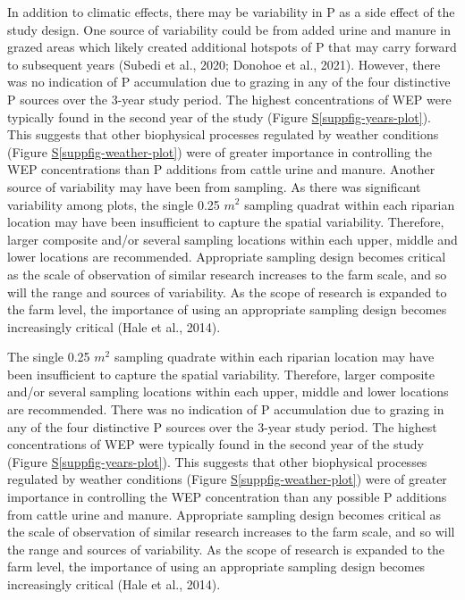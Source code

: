 \documentclass[
]{agujournal2019}
\newcommand*\quartosuppfigref[1]{Figure \hyperref[#1]{S\ref{#1}}}
\begin{document}
In addition to climatic effects, there may be variability in P as a side
effect of the study design. One source of variability could be from
added urine and manure in grazed areas which likely created additional
hotspots of P that may carry forward to subsequent years (Subedi et al.,
2020; Donohoe et al., 2021). However, there was no indication of P
accumulation due to grazing in any of the four distinctive P sources
over the 3-year study period. The highest concentrations of WEP were
typically found in the second year of the study
(\quartosuppfigref{suppfig-years-plot}). This suggests that other
biophysical processes regulated by weather conditions
(\quartosuppfigref{suppfig-weather-plot}) were of greater importance in
controlling the WEP concentrations than P additions from cattle urine
and manure. Another source of variability may have been from sampling.
As there was significant variability among plots, the single 0.25
\(m^2\) sampling quadrat within each riparian location may have been
insufficient to capture the spatial variability. Therefore, larger
composite and/or several sampling locations within each upper, middle
and lower locations are recommended. Appropriate sampling design becomes
critical as the scale of observation of similar research increases to
the farm scale, and so will the range and sources of variability. As the
scope of research is expanded to the farm level, the importance of using
an appropriate sampling design becomes increasingly critical (Hale et
al., 2014).

The single 0.25 \(m^2\) sampling quadrate within each riparian location
may have been insufficient to capture the spatial variability.
Therefore, larger composite and/or several sampling locations within
each upper, middle and lower locations are recommended. There was no
indication of P accumulation due to grazing in any of the four
distinctive P sources over the 3-year study period. The highest
concentrations of WEP were typically found in the second year of the
study (\quartosuppfigref{suppfig-years-plot}). This suggests that other
biophysical processes regulated by weather conditions
(\quartosuppfigref{suppfig-weather-plot}) were of greater importance in
controlling the WEP concentration than any possible P additions from
cattle urine and manure. Appropriate sampling design becomes critical as
the scale of observation of similar research increases to the farm
scale, and so will the range and sources of variability. As the scope of
research is expanded to the farm level, the importance of using an
appropriate sampling design becomes increasingly critical (Hale et al.,
2014).
\end{document}
